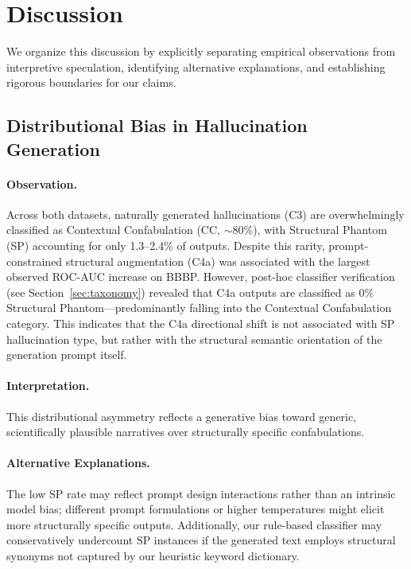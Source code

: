 \section{Discussion}
\label{sec:discussion}

We organize this discussion by explicitly separating empirical observations from interpretive speculation, identifying alternative explanations, and establishing rigorous boundaries for our claims.

\subsection{Distributional Bias in Hallucination Generation}
\paragraph{Observation.} Across both datasets, naturally generated hallucinations (C3) are overwhelmingly classified as Contextual Confabulation (CC, $\sim$80\%), with Structural Phantom (SP) accounting for only 1.3--2.4\% of outputs. Despite this rarity, prompt-constrained structural augmentation (C4a) was associated with the largest observed ROC-AUC increase on BBBP. However, post-hoc classifier verification (see Section~\ref{sec:taxonomy}) revealed that C4a outputs are classified as 0\% Structural Phantom---predominantly falling into the Contextual Confabulation category. This indicates that the C4a directional shift is not associated with SP hallucination type, but rather with the structural semantic orientation of the generation prompt itself.

\paragraph{Interpretation.} This distributional asymmetry reflects a generative bias toward generic, scientifically plausible narratives over structurally specific confabulations.

\paragraph{Alternative Explanations.} The low SP rate may reflect prompt design interactions rather than an intrinsic model bias; different prompt formulations or higher temperatures might elicit more structurally specific outputs. Additionally, our rule-based classifier may conservatively undercount SP instances if the generated text employs structural synonyms not captured by our heuristic keyword dictionary.

